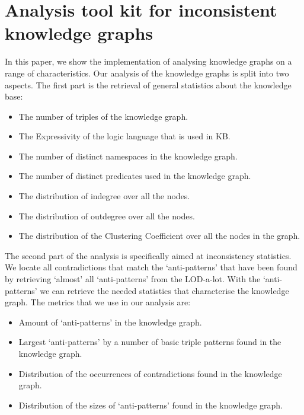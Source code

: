 \documentclass[11pt,letterpaper ,oneside ]{book}
\begin{document}
\section{Analysis tool kit for inconsistent knowledge graphs}
In this paper, we show the implementation of analysing knowledge graphs on a range of characteristics. Our analysis of the knowledge graphs is split into two aspects. The first part is the retrieval of general statistics about the knowledge base:
\begin{itemize}
	\item The number of triples of the knowledge graph.
	\item The Expressivity of the logic language that is used in KB.
	\item The number of distinct namespaces in the knowledge graph.
	\item The number of distinct predicates used in the knowledge graph.
	\item The distribution of indegree over all the nodes.
	\item The distribution of outdegree over all the nodes.
	\item The distribution of the Clustering Coefficient over all the nodes in the graph.
\end{itemize}

The second part of the analysis is specifically aimed at inconsistency statistics. We locate all contradictions that match the `anti-patterns' that have been found by retrieving `almost' all `anti-patterns' from the LOD-a-lot. With the `anti-patterns' we can retrieve the needed statistics that characterise the knowledge graph. The metrics that we use in our analysis are:
\begin{itemize}
	\item Amount of `anti-patterns' in the knowledge graph.
	\item Largest `anti-patterns' by a number of basic triple patterns found in the knowledge graph.
	\item Distribution of the occurrences of contradictions found in the knowledge graph.
	\item Distribution of the sizes of `anti-patterns' found in the knowledge graph.
\end{itemize} 
\end{document}
